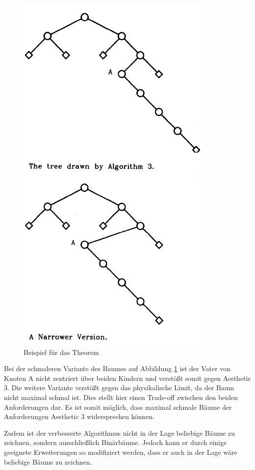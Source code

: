 \begin{figure}[H]
    \centering
    \includegraphics[scale = 0.75]{abbildungen/baum_theorem_uglification}
    \caption{Beispiel für das Theorem\cite[]{q1}}
    \label{pic:baum_theorem_uglification} 
\end{figure}

Bei der schmaleren Variante des Baumes auf Abbildung \ref{pic:baum_theorem_uglification} ist der Vater von Knoten A nicht zentriert
über beiden Kindern und verstößt somit gegen Aesthetic 3. Die weitere Variante verstößt gegen das physikalische Limit, da der Baum nicht
maximal schmal ist. Dies stellt hier einen Trade-off zwischen den beiden Anforderungen dar. Es ist somit möglich, dass maximal schmale Bäume der
Anforderungen Aesthetic 3 widersprechen können. 

Zudem ist der verbesserte Algorithmus nicht in der Lage beliebige Bäume zu zeichnen, sondern ausschließlich Binärbäume. Jedoch kann er durch
einige geeignete Erweiterungen so modifiziert werden, dass er auch in der Lage wäre beliebige Bäume zu zeichnen.
